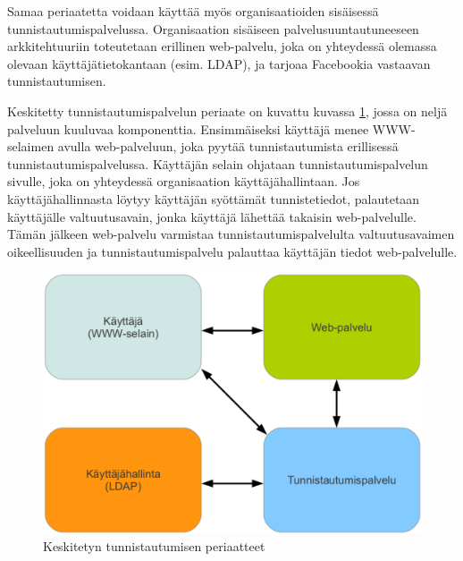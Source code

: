 Samaa periaatetta voidaan käyttää myös organisaatioiden sisäisessä tunnistautumispalvelussa. Organisaation sisäiseen palvelusuuntautuneeseen arkkitehtuuriin toteutetaan erillinen web-palvelu, joka on yhteydessä olemassa olevaan käyttäjätietokantaan (esim. LDAP), ja tarjoaa Facebookia vastaavan tunnistautumisen.

Keskitetty tunnistautumispalvelun periaate on kuvattu kuvassa \ref{composition}, jossa on neljä palveluun kuuluvaa komponenttia. Ensimmäiseksi käyttäjä menee WWW-selaimen avulla web-palveluun, joka pyytää tunnistautumista erillisessä tunnistautumispalvelussa. Käyttäjän selain ohjataan tunnistautumispalvelun sivulle, joka on yhteydessä organisaation käyttäjähallintaan. Jos käyttäjähallinnasta löytyy käyttäjän syöttämät tunnistetiedot, palautetaan käyttäjälle valtuutusavain, jonka käyttäjä lähettää takaisin web-palvelulle. Tämän jälkeen web-palvelu varmistaa tunnistautumispalvelulta valtuutusavaimen oikeellisuuden ja tunnistautumispalvelu palauttaa käyttäjän tiedot web-palvelulle.

\begin{figure}[ht]
\centering
\includegraphics[width=\textwidth]{teknologiat/composition.eps}
\caption{Keskitetyn tunnistautumisen periaatteet}%
\label{composition}
\end{figure}
